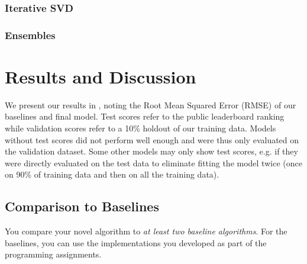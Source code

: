 \documentclass[10pt,conference,compsocconf]{IEEEtran}
\begin{document}
    \subsubsection{Iterative SVD}

    \subsubsection{Ensembles}


    \section{Results and Discussion}
    We present our results in , noting the Root Mean Squared Error (RMSE) of our baselines and final model.
    Test scores refer to the public leaderboard ranking while validation scores refer to a 10\% holdout of our training data.
    Models without test scores did not perform well enough and were thus only evaluated on the validation dataset.
    Some other models may only show test scores, e.g. if they were directly evaluated on the test data to eliminate
    fitting the model twice (once on 90\% of training data and then on all the training data).

    \begin{table}
        \centering
        \caption{We note Root Mean Squared Error (RMSE) on test and validation datasets to compare our baselines.}
        \label{tab:ablation}
    \end{table}

    \subsection{Comparison to Baselines}

    You compare your novel algorithm to \emph{at least two baseline
    algorithms}. For the baselines, you can use the implementations you
    developed as part of the programming assignments.
\end{document}
